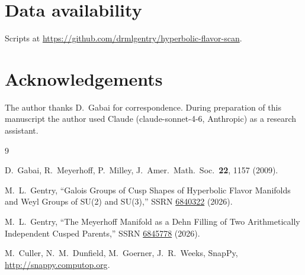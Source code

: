 \documentclass[11pt,a4paper]{article}
\theoremstyle{definition}
\theoremstyle{remark}
\begin{document}
\section*{Data availability}
Scripts at
\url{https://github.com/drmlgentry/hyperbolic-flavor-scan}.

\section*{Acknowledgements}
The author thanks D.~Gabai for correspondence.
During preparation of this manuscript the author used
Claude (claude-sonnet-4-6, Anthropic) as a research assistant.

\begin{thebibliography}{9}

D.~Gabai, R.~Meyerhoff, P.~Milley,
J.\ Amer.\ Math.\ Soc.\ \textbf{22}, 1157 (2009).

M.~L.~Gentry,
``Galois Groups of Cusp Shapes of Hyperbolic Flavor
Manifolds and Weyl Groups of SU(2) and SU(3),''
SSRN \href{https://doi.org/10.2139/ssrn.6840322}{6840322} (2026).

M.~L.~Gentry,
``The Meyerhoff Manifold as a Dehn Filling of Two
Arithmetically Independent Cusped Parents,''
SSRN \href{https://doi.org/10.2139/ssrn.6845778}{6845778} (2026).

M.~Culler, N.~M.~Dunfield, M.~Goerner, J.~R.~Weeks,
SnapPy, \url{http://snappy.computop.org}.

\end{thebibliography}
\end{document}
